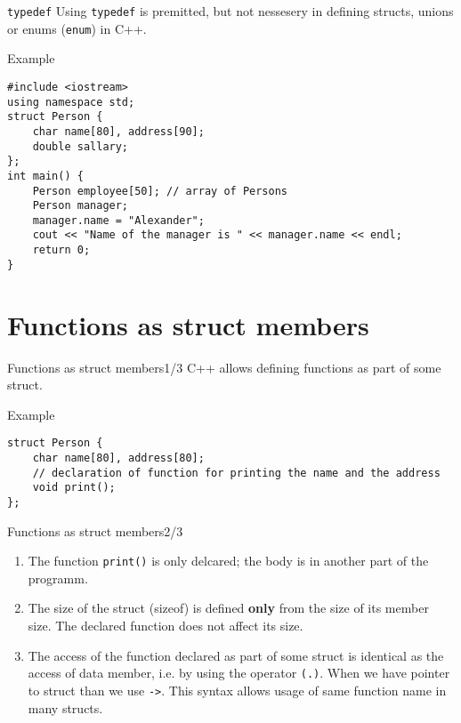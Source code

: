 \begin{frame}[fragile]{\texttt{typedef}}
Using \texttt{typedef} is premitted, but not nessesery in defining structs,
unions or enums (\texttt{enum}) in C++.
\begin{exampleblock}{Example}
\begin{lstlisting}
#include <iostream>
using namespace std;
struct Person {
    char name[80], address[90];
    double sallary;
};
int main() {
    Person employee[50]; // array of Persons
    Person manager;
    manager.name = "Alexander";
    cout << "Name of the manager is " << manager.name << endl;
    return 0;
}
\end{lstlisting}
\end{exampleblock}
\end{frame}

\section{Functions as struct members}

\begin{frame}[fragile]{Functions as struct members}{1/3}
C++ allows defining functions as part of some struct.
\begin{exampleblock}{Example}
\begin{lstlisting}
struct Person {
    char name[80], address[80];
    // declaration of function for printing the name and the address
    void print();
};
\end{lstlisting}
\end{exampleblock}
\end{frame}

\begin{frame}{Functions as struct members}{2/3}
\begin{enumerate}
  \item The function \texttt{print()} is only delcared; the body is in another
  part of the programm.
    \item The size of the struct (sizeof) is defined \textbf{only} from the size
    of its member size. The declared function does not affect its size.    
    \item The access of the function declared as part of some struct is
    identical as the access of data member, i.e. by using the operator
    \texttt{(.)}. When we have pointer to struct than we use \texttt{->}.
    This syntax allows usage of same function name in many structs.
\end{enumerate}
\end{frame}

